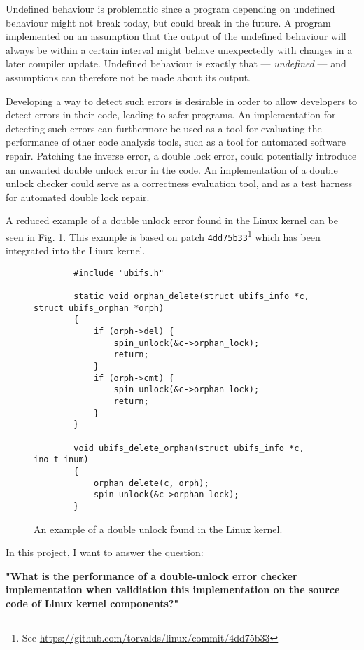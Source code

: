 \newpar Undefined behaviour is problematic since a program depending on undefined behaviour might not break today, but could break in the future. A program implemented on an assumption that the output of the undefined behaviour will always be within a certain interval might behave unexpectedly with changes in a later compiler update. Undefined behaviour is exactly that --- \textit{undefined} --- and assumptions can therefore not be made about its output.

\newpar Developing a way to detect such errors is desirable in order to allow developers to detect errors in their code, leading to safer programs. An implementation for detecting such errors can furthermore be used as a tool for evaluating the performance of other code analysis tools, such as a tool for automated software repair. Patching the inverse error, a double lock error, could potentially introduce an unwanted double unlock error in the code. An implementation of a double unlock checker could serve as a correctness evaluation tool, and as a test harness for automated double lock repair.

\newpar A reduced example of a double unlock error found in the Linux kernel can be seen in Fig. \ref{fig:introexample}. This example is based on patch \texttt{4dd75b33}\footnote{See \url{https://github.com/torvalds/linux/commit/4dd75b33}} which has been integrated into the Linux kernel.

\begin{figure}[H]
    \centering
    \begin{verbatim}
        #include "ubifs.h"

        static void orphan_delete(struct ubifs_info *c, struct ubifs_orphan *orph)
        {
            if (orph->del) {
                spin_unlock(&c->orphan_lock);
                return;
            }
            if (orph->cmt) {
                spin_unlock(&c->orphan_lock);
                return;
            }
        }
        
        void ubifs_delete_orphan(struct ubifs_info *c, ino_t inum)
        {
            orphan_delete(c, orph);
            spin_unlock(&c->orphan_lock);
        }
    \end{verbatim}
    \caption{An example of a double unlock found in the Linux kernel.}
    \label{fig:introexample}
\end{figure}
\newpar In this project, I want to answer the question:

\begin{center}
    \textbf{"What is the performance of a double-unlock error checker implementation when validiation this implementation on the source code of Linux kernel components?"} 
\end{center}

